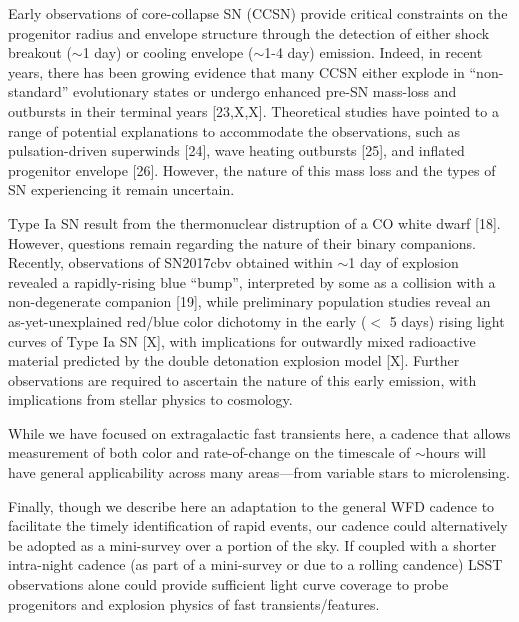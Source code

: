 \documentclass[12pt, letterpaper]{article}
\begin{document}
\smallskip
{} Early observations of core-collapse SN (CCSN) provide critical constraints on the progenitor radius and envelope structure through the detection of either shock breakout ($\sim$1 day) or cooling envelope ($\sim$1-4 day) emission. Indeed, in recent years, there has been growing evidence that many CCSN either explode in ``non-standard'' evolutionary states or undergo enhanced pre-SN mass-loss and outbursts in their terminal years [23,X,X]. Theoretical studies have pointed to a range of potential explanations to accommodate the observations, such as pulsation-driven superwinds [24], wave heating outbursts [25], and inflated progenitor envelope [26]. However, the nature of this mass loss and the types of SN experiencing it remain uncertain.



\smallskip
{}
Type Ia SN result from the thermonuclear distruption of a CO white dwarf [18]. However, questions remain regarding the nature of their binary companions. Recently, observations of SN2017cbv obtained within $\sim$1 day of explosion revealed a rapidly-rising blue ``bump'', interpreted by some as a collision with a non-degenerate companion [19], while preliminary population studies reveal an as-yet-unexplained red/blue color dichotomy in the early ($<$ 5 days) rising light curves of Type Ia SN [X], with implications for outwardly mixed radioactive material predicted by the double detonation explosion model [X]. Further observations are required to ascertain the nature of this early emission, with implications from stellar physics to cosmology. 




\smallskip
{} While we have focused on extragalactic fast transients here, a cadence that allows measurement of both color and rate-of-change on the timescale of $\sim$hours will have general applicability across many areas---from variable stars to microlensing.

\medskip
Finally, though we describe here an adaptation to the general WFD cadence to facilitate the timely identification of rapid events, our cadence could alternatively be adopted as a mini-survey over a portion of the sky. If coupled with a shorter intra-night cadence (as part of a mini-survey or due to a rolling candence) LSST observations alone could provide sufficient light curve coverage to probe progenitors and explosion physics of fast transients/features.
\end{document}
